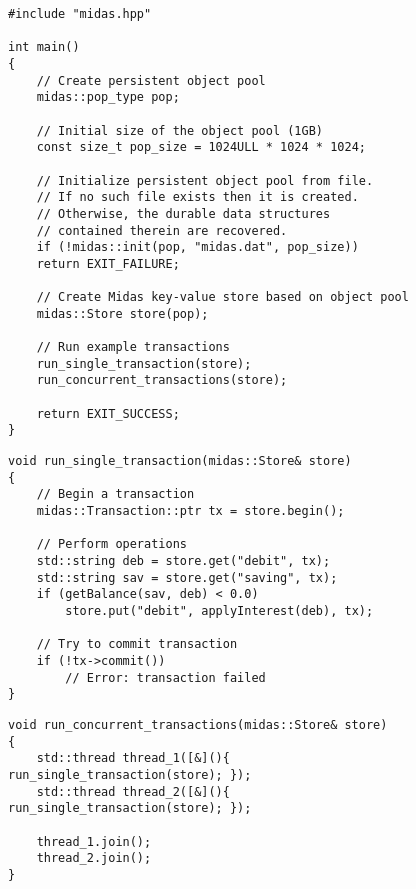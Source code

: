 \begin{figure}
\begin{lstlisting}
#include "midas.hpp"

int main()
{
    // Create persistent object pool
    midas::pop_type pop;

    // Initial size of the object pool (1GB)
    const size_t pop_size = 1024ULL * 1024 * 1024;

    // Initialize persistent object pool from file.
    // If no such file exists then it is created.
    // Otherwise, the durable data structures
    // contained therein are recovered.
    if (!midas::init(pop, "midas.dat", pop_size))
    return EXIT_FAILURE;

    // Create Midas key-value store based on object pool
    midas::Store store(pop);

    // Run example transactions
    run_single_transaction(store);
    run_concurrent_transactions(store);

    return EXIT_SUCCESS;
}
\end{lstlisting}
\caption{}
\label{lst:usage-example-lifetime}
\end{figure}

\begin{figure}
\begin{lstlisting}
void run_single_transaction(midas::Store& store)
{
    // Begin a transaction
    midas::Transaction::ptr tx = store.begin();

    // Perform operations
    std::string deb = store.get("debit", tx);
    std::string sav = store.get("saving", tx);
    if (getBalance(sav, deb) < 0.0)
        store.put("debit", applyInterest(deb), tx);

    // Try to commit transaction
    if (!tx->commit())
        // Error: transaction failed
}
\end{lstlisting}
\caption{}
\label{lst:usage-single-transaction}
\end{figure}

\begin{figure}
\begin{lstlisting}
void run_concurrent_transactions(midas::Store& store)
{
    std::thread thread_1([&](){ run_single_transaction(store); });
    std::thread thread_2([&](){ run_single_transaction(store); });

    thread_1.join();
    thread_2.join();
}
\end{lstlisting}
\caption{}
\label{lst:usage-concurrent-transactions}
\end{figure}
